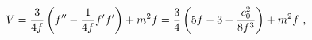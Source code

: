 \begin{equation}
V= {3\over 4 f} \left(f'' -{1\over 4 f} f' f'\right) + m^2f
={3\over 4} \left(5f -3 - {c_0^2\over 8 f^3}\right) + m^2 f
\ ,
\label{port}
\end{equation}

